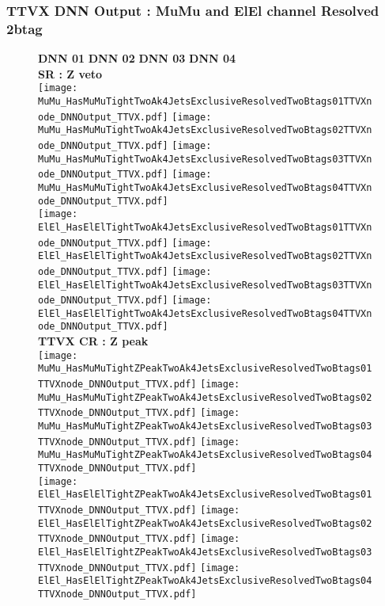 \documentclass[9pt]{beamer}
\begin{document}
\begin{frame}
	\frametitle{TTVX DNN Output : MuMu and ElEl channel Resolved 2btag}
	\begin{figure}
	    \textbf{DNN 01} \hspace{1.2cm} \textbf{DNN 02} \hspace{1.2cm} \textbf{DNN 03} \hspace{1.2cm} \textbf{DNN 04} \\
        \centering
        \textbf{SR : Z veto} \\
		\texttt{[image: MuMu\_HasMuMuTightTwoAk4JetsExclusiveResolvedTwoBtags01TTVXnode\_DNNOutput\_TTVX.pdf]}
		\texttt{[image: MuMu\_HasMuMuTightTwoAk4JetsExclusiveResolvedTwoBtags02TTVXnode\_DNNOutput\_TTVX.pdf]}
		\texttt{[image: MuMu\_HasMuMuTightTwoAk4JetsExclusiveResolvedTwoBtags03TTVXnode\_DNNOutput\_TTVX.pdf]}
		\texttt{[image: MuMu\_HasMuMuTightTwoAk4JetsExclusiveResolvedTwoBtags04TTVXnode\_DNNOutput\_TTVX.pdf]}\\
		\texttt{[image: ElEl\_HasElElTightTwoAk4JetsExclusiveResolvedTwoBtags01TTVXnode\_DNNOutput\_TTVX.pdf]}
		\texttt{[image: ElEl\_HasElElTightTwoAk4JetsExclusiveResolvedTwoBtags02TTVXnode\_DNNOutput\_TTVX.pdf]}
		\texttt{[image: ElEl\_HasElElTightTwoAk4JetsExclusiveResolvedTwoBtags03TTVXnode\_DNNOutput\_TTVX.pdf]}
		\texttt{[image: ElEl\_HasElElTightTwoAk4JetsExclusiveResolvedTwoBtags04TTVXnode\_DNNOutput\_TTVX.pdf]}\\
        \textbf{TTVX CR : Z peak} \\
		\texttt{[image: MuMu\_HasMuMuTightZPeakTwoAk4JetsExclusiveResolvedTwoBtags01TTVXnode\_DNNOutput\_TTVX.pdf]}
		\texttt{[image: MuMu\_HasMuMuTightZPeakTwoAk4JetsExclusiveResolvedTwoBtags02TTVXnode\_DNNOutput\_TTVX.pdf]}
		\texttt{[image: MuMu\_HasMuMuTightZPeakTwoAk4JetsExclusiveResolvedTwoBtags03TTVXnode\_DNNOutput\_TTVX.pdf]}
		\texttt{[image: MuMu\_HasMuMuTightZPeakTwoAk4JetsExclusiveResolvedTwoBtags04TTVXnode\_DNNOutput\_TTVX.pdf]}\\
		\texttt{[image: ElEl\_HasElElTightZPeakTwoAk4JetsExclusiveResolvedTwoBtags01TTVXnode\_DNNOutput\_TTVX.pdf]}
		\texttt{[image: ElEl\_HasElElTightZPeakTwoAk4JetsExclusiveResolvedTwoBtags02TTVXnode\_DNNOutput\_TTVX.pdf]}
		\texttt{[image: ElEl\_HasElElTightZPeakTwoAk4JetsExclusiveResolvedTwoBtags03TTVXnode\_DNNOutput\_TTVX.pdf]}
		\texttt{[image: ElEl\_HasElElTightZPeakTwoAk4JetsExclusiveResolvedTwoBtags04TTVXnode\_DNNOutput\_TTVX.pdf]}\\
	\end{figure}
\end{frame}
\end{document}
